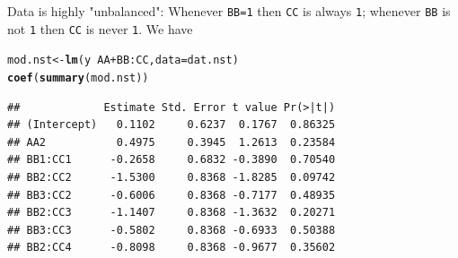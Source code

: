 \documentclass[10pt]{article}\usepackage[]{graphicx}\usepackage[]{color}
\makeatletter
\newcommand{\hlopt}[1]{\textcolor[rgb]{0,0,0}{#1}}%
\newcommand{\hlstd}[1]{\textcolor[rgb]{0.345,0.345,0.345}{#1}}%
\newcommand{\hlkwb}[1]{\textcolor[rgb]{0.69,0.353,0.396}{#1}}%
\newcommand{\hlkwc}[1]{\textcolor[rgb]{0.333,0.667,0.333}{#1}}%
\newcommand{\hlkwd}[1]{\textcolor[rgb]{0.737,0.353,0.396}{\textbf{#1}}}%
\newenvironment{kframe}{%
 \def\at@end@of@kframe{}%
 \ifinner\ifhmode%
  \def\at@end@of@kframe{\end{minipage}}%
  \begin{minipage}{\columnwidth}%
 \fi\fi%
 \def\FrameCommand##1{\hskip\@totalleftmargin \hskip-\fboxsep
 \colorbox{shadecolor}{##1}\hskip-\fboxsep
     \hskip-\linewidth \hskip-\@totalleftmargin \hskip\columnwidth}%
 \MakeFramed {\advance\hsize-\width
   \@totalleftmargin\z@ \linewidth\hsize
   \@setminipage}}%
 {\par\unskip\endMakeFramed%
 \at@end@of@kframe}
\newenvironment{knitrout}{}{} %
\makeatother
\begin{document}
Data is highly "unbalanced":
Whenever \verb|BB=1| then \verb|CC| is always \verb|1|; whenever
\verb|BB| is not \verb|1| then \verb|CC| is never \verb|1|.
We have
\begin{knitrout}
\color{fgcolor}\begin{kframe}
\begin{alltt}
\hlstd{mod.nst}  \hlkwb{<-} \hlkwd{lm}\hlstd{(y} \hlopt{~} \hlstd{AA} \hlopt{+} \hlstd{BB} \hlopt{:} \hlstd{CC,} \hlkwc{data}\hlstd{=dat.nst)}
\hlkwd{coef}\hlstd{(}\hlkwd{summary}\hlstd{(mod.nst))}
\end{alltt}
\begin{verbatim}
##             Estimate Std. Error t value Pr(>|t|)
## (Intercept)   0.1102     0.6237  0.1767  0.86325
## AA2           0.4975     0.3945  1.2613  0.23584
## BB1:CC1      -0.2658     0.6832 -0.3890  0.70540
## BB2:CC2      -1.5300     0.8368 -1.8285  0.09742
## BB3:CC2      -0.6006     0.8368 -0.7177  0.48935
## BB2:CC3      -1.1407     0.8368 -1.3632  0.20271
## BB3:CC3      -0.5802     0.8368 -0.6933  0.50388
## BB2:CC4      -0.8098     0.8368 -0.9677  0.35602
\end{verbatim}
\end{kframe}
\end{knitrout}
\end{document}

